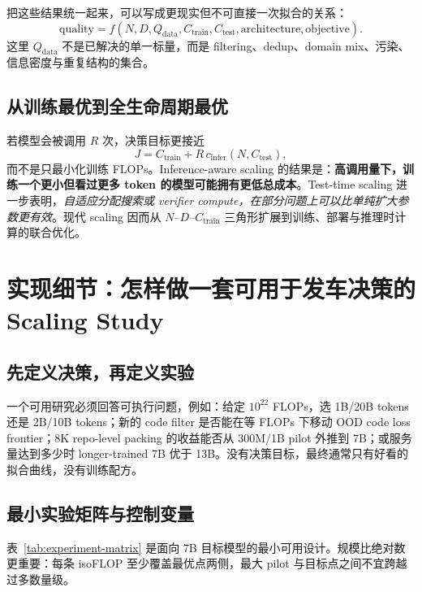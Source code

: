 \documentclass[UTF8,10pt,a4paper,fontset=none]{ctexart}
\begin{document}
把这些结果统一起来，可以写成更现实但不可直接一次拟合的关系：
\begin{equation}
 \mathrm{quality}=f\!\left(N,D,Q_{\mathrm{data}},C_{\mathrm{train}},
 C_{\mathrm{test}},\mathrm{architecture},\mathrm{objective}\right).
 \label{eq:modern-scaling}
\end{equation}
这里 $Q_{\mathrm{data}}$ 不是已解决的单一标量，而是 filtering、dedup、domain mix、污染、信息密度与重复结构的集合。

\subsection{从训练最优到全生命周期最优}

若模型会被调用 $R$ 次，决策目标更接近
\begin{equation}
  J=C_{\mathrm{train}}+R\,c_{\mathrm{infer}}(N,C_{\mathrm{test}}),
  \label{eq:lifecycle}
\end{equation}
而不是只最小化训练 FLOPs。Inference-aware scaling 的结果是：\textbf{高调用量下，训练一个更小但看过更多 token 的模型可能拥有更低总成本}\cite{sardana2024}。Test-time scaling 进一步表明，\textit{自适应分配搜索或 verifier compute，在部分问题上可以比单纯扩大参数更有效}\cite{snell2024}。现代 scaling 因而从 $N$--$D$--$C_{\mathrm{train}}$ 三角形扩展到训练、部署与推理时计算的联合优化。

\section{实现细节：怎样做一套可用于发车决策的 Scaling Study}

\subsection{先定义决策，再定义实验}

一个可用研究必须回答可执行问题，例如：给定 $10^{22}$ FLOPs，选 1B/20B tokens 还是 2B/10B tokens；新的 code filter 是否能在等 FLOPs 下移动 OOD code loss frontier；8K repo-level packing 的收益能否从 300M/1B pilot 外推到 7B；或服务量达到多少时 longer-trained 7B 优于 13B。没有决策目标，最终通常只有好看的拟合曲线，没有训练配方。

\subsection{最小实验矩阵与控制变量}

表~\ref{tab:experiment-matrix} 是面向 7B 目标模型的最小可用设计。规模比绝对数更重要：每条 isoFLOP 至少覆盖最优点两侧，最大 pilot 与目标点之间不宜跨越过多数量级。
\end{document}
